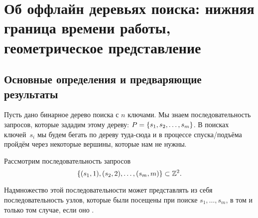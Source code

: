 \section{Об оффлайн деревьях поиска: нижняя граница времени работы, геометрическое представление} 

\subsection{Основные определения и предваряющие результаты}

Пусть дано бинарное дерево поиска с $n$ ключами. Мы знаем последовательность запросов, которые зададим этому дереву: $P = \lbrace s_1,s_2,\ldots,s_m\rbrace$. В поисках ключей~$s_i$ мы будем бегать по дереву туда-сюда и в процессе спуска/подъёма пройдём через некоторые вершины, которые нам не нужны.





\begin{theorem}
	Рассмотрим последовательность запросов
	\begin{equation*}
		\lbrace(s_1,1),(s_2,2),\ldots,(s_m,m)\rbrace \subset {\mathbb Z}^2.
	\end{equation*}

	Надмножество этой последовательности может представлять из себя последовательность узлов, которые были посещены при поиске $s_1, \ldots, s_m$, в том и только том случае, если оно \arbs.
\end{theorem}



